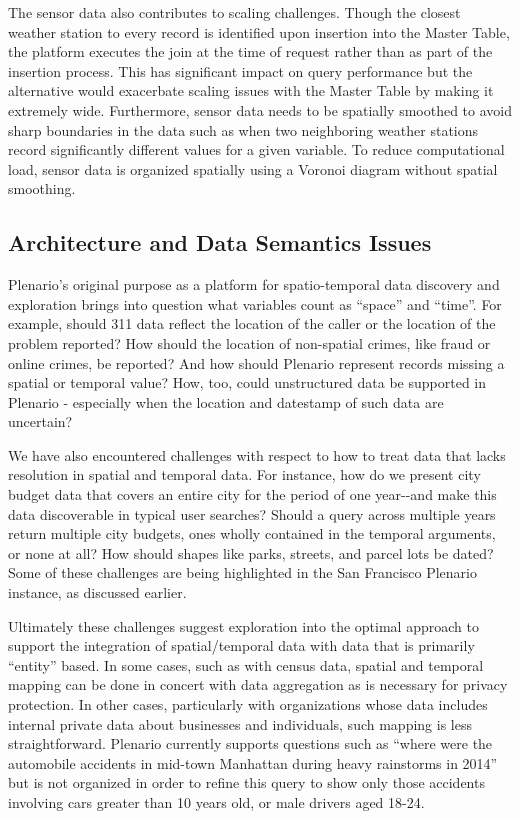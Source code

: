 \documentclass[11pt]{article}
\begin{document}
The sensor data also contributes to scaling challenges. Though the closest weather station to every record is identified upon insertion into the Master Table, the platform executes the join at the time of request rather than as part of the insertion process. This has significant impact on query performance but the alternative would exacerbate scaling issues with the Master Table by making it extremely wide. Furthermore, sensor data needs to be spatially smoothed to avoid sharp boundaries in the data such as when two neighboring weather stations record significantly different values for a given variable. To reduce computational load, sensor data is organized spatially using a Voronoi diagram \cite{voronoi_1908} without spatial smoothing.

\subsection{\textbf{Architecture and Data Semantics Issues}}
Plenario's original purpose as a platform for spatio-temporal data discovery and exploration brings into question what variables count as ``space'' and ``time''. For example, should 311 data reflect the location of the caller or the location of the problem reported? How should the location of non-spatial crimes, like fraud or online crimes, be reported? And how should Plenario represent records missing a spatial or temporal value? How, too, could unstructured data be supported in Plenario - especially when the location and datestamp of such data are uncertain?

We have also encountered challenges with respect to how to treat data that lacks resolution in spatial and temporal data. For instance, how do we present city budget data that covers an entire city for the period of one year-{}-and make this data discoverable in typical user searches? Should a query across multiple years return multiple city budgets, ones wholly contained in the temporal arguments, or none at all? How should shapes like parks, streets, and parcel lots be dated? Some of these challenges are being highlighted in the San Francisco Plenario instance, as discussed earlier.

Ultimately these challenges suggest exploration into the optimal approach to support the integration of spatial/temporal data with data that is primarily ``entity'' based. In some cases, such as with census data, spatial and temporal mapping can be done in concert with data aggregation as is necessary for privacy protection. In other cases, particularly with organizations whose data includes internal private data about businesses and individuals, such mapping is less straightforward. Plenario currently supports questions such as ``where were the automobile accidents in mid-town Manhattan during heavy rainstorms in 2014'' but is not organized in order to refine this query to show only those accidents involving cars greater than 10 years old, or male drivers aged 18-24.
\end{document}

